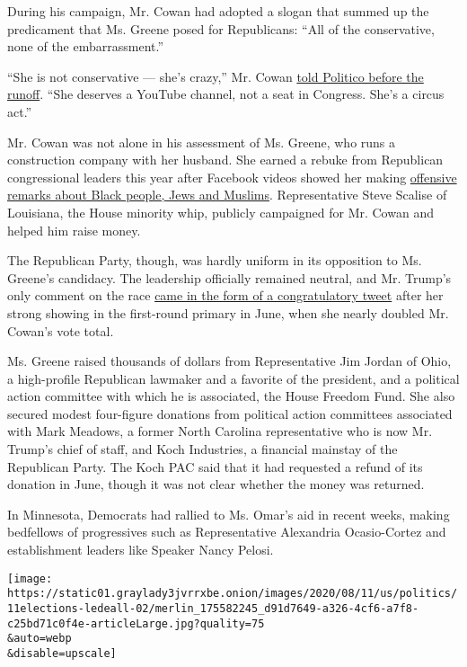 During his campaign, Mr. Cowan had adopted a slogan that summed up the
predicament that Ms. Greene posed for Republicans: ``All of the
conservative, none of the embarrassment.''

``She is not conservative --- she's crazy,'' Mr. Cowan
\href{https://www.politico.com/news/2020/08/09/republicans-marjorie-taylor-greene-392735}{told
Politico before the runoff}. ``She deserves a YouTube channel, not a
seat in Congress. She's a circus act.''

Mr. Cowan was not alone in his assessment of Ms. Greene, who runs a
construction company with her husband. She earned a rebuke from
Republican congressional leaders this year after Facebook videos showed
her making
\href{https://www.nytimes3xbfgragh.onion/2020/06/17/us/marjorie-taylor-greene-georgia.html}{offensive
remarks about Black people, Jews and Muslims}. Representative Steve
Scalise of Louisiana, the House minority whip, publicly campaigned for
Mr. Cowan and helped him raise money.

The Republican Party, though, was hardly uniform in its opposition to
Ms. Greene's candidacy. The leadership officially remained neutral, and
Mr. Trump's only comment on the race
\href{https://www.nytimes3xbfgragh.onion/2020/07/14/us/politics/qanon-politicians-candidates.html}{came
in the form of a congratulatory tweet} after her strong showing in the
first-round primary in June, when she nearly doubled Mr. Cowan's vote
total.

Ms. Greene raised thousands of dollars from Representative Jim Jordan of
Ohio, a high-profile Republican lawmaker and a favorite of the
president, and a political action committee with which he is associated,
the House Freedom Fund. She also secured modest four-figure donations
from political action committees associated with Mark Meadows, a former
North Carolina representative who is now Mr. Trump's chief of staff, and
Koch Industries, a financial mainstay of the Republican Party. The Koch
PAC said that it had requested a refund of its donation in June, though
it was not clear whether the money was returned.

In Minnesota, Democrats had rallied to Ms. Omar's aid in recent weeks,
making bedfellows of progressives such as Representative Alexandria
Ocasio-Cortez and establishment leaders like Speaker Nancy Pelosi.

\texttt{[image: https://static01.graylady3jvrrxbe.onion/images/2020/08/11/us/politics/11elections-ledeall-02/merlin\_175582245\_d91d7649-a326-4cf6-a7f8-c25bd71c0f4e-articleLarge.jpg?quality=75\\\&auto=webp\\\&disable=upscale]}

